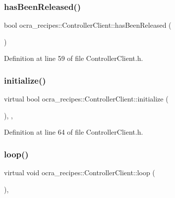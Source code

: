 \subsubsection{\texorpdfstring{has\+Been\+Released()}{hasBeenReleased()}}
{\footnotesize\ttfamily bool ocra\+\_\+recipes\+::\+Controller\+Client\+::has\+Been\+Released (\begin{DoxyParamCaption}{ }\end{DoxyParamCaption})\hspace{0.3cm}{\ttfamily [inline]}}



Definition at line 59 of file Controller\+Client.\+h.

\hypertarget{classocra__recipes_1_1ControllerClient_a8ac06cc5d7d6b0e078e1cb377a998c25}{}\label{classocra__recipes_1_1ControllerClient_a8ac06cc5d7d6b0e078e1cb377a998c25} 
\subsubsection{\texorpdfstring{initialize()}{initialize()}}
{\footnotesize\ttfamily virtual bool ocra\+\_\+recipes\+::\+Controller\+Client\+::initialize (\begin{DoxyParamCaption}{ }\end{DoxyParamCaption})\hspace{0.3cm}{\ttfamily [inline]}, {\ttfamily [protected]}, {\ttfamily [virtual]}}



Definition at line 64 of file Controller\+Client.\+h.

\hypertarget{classocra__recipes_1_1ControllerClient_ac6d28be8e314dd2a034cfcb512e29ee3}{}\label{classocra__recipes_1_1ControllerClient_ac6d28be8e314dd2a034cfcb512e29ee3} 
\subsubsection{\texorpdfstring{loop()}{loop()}}
{\footnotesize\ttfamily virtual void ocra\+\_\+recipes\+::\+Controller\+Client\+::loop (\begin{DoxyParamCaption}{ }\end{DoxyParamCaption})\hspace{0.3cm}{\ttfamily [protected]}, {}}

